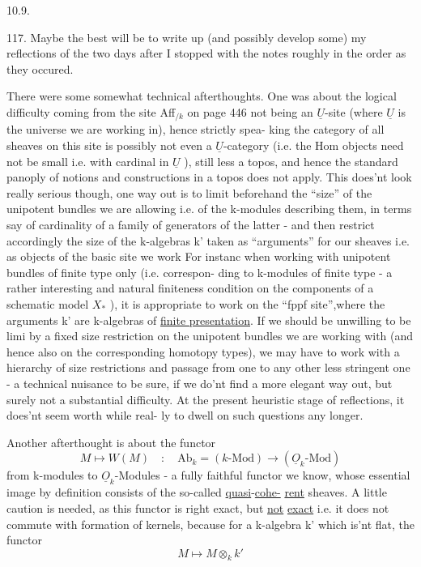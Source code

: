 
10.9.

117. Maybe the best will be to write up (and possibly develop some)
my reflections \hand{(}of the two days after I stopped with the
notes\hand{)} roughly in the order as they occured.

There were some somewhat technical afterthoughts. One was about the
logical difficulty coming from the site Aff$_{/k}$ on page 446 not being an
$\underline{U}$-site (where $\underline{U}$ is the universe we are working in), hence strictly spea-%
king the category of all sheaves on this site is possibly not even a
$\underline{U}$-category (i.e. the Hom objects need not be small i.e. with cardinal in
$\underline{U}$ ), still less a topos, and hence the standard panoply of notions and
constructions in a topos does not apply. This does'nt look really serious
though, one way out is to limit beforehand the ``size'' of the unipotent
bundles we are allowing i.e. of the k-modules describing them, in terms
say of cardinality of a family of generators of the latter - and then
restrict accordingly the size of the k-algebras k' taken as ``arguments''
for our sheaves i.e. as objects of the basic site we work For instanc
when working with unipotent bundles of finite type only (i.e. correspon-%
ding to k-modules of finite type - a rather interesting and natural
finiteness  condition on the components of a schematic model $X_{\ast}$ ),
it is appropriate to work on the ``fppf site'',where the arguments k' are
k-algebras of \uline{finite presentation}. If we should be unwilling to be limi
by a fixed size restriction on the unipotent bundles we are working with
(and hence also on the corresponding homotopy types), we may have to work
with a hierarchy of size restrictions and passage from one to any other
less stringent one - a technical nuisance to be sure, if we do'nt find
a more elegant way out, but surely not a substantial difficulty. At the
present heuristic stage of reflections, it does'nt seem worth while real-%
ly to dwell on such questions any longer.

Another afterthought is about the functor
\[ M \longmapsto W(M) \quad : \quad \mathrm{Ab}_k =(k\text{-Mod}) \longrightarrow (\underline{O}_k\text{-Mod}) \]
from k-modules to  $\underline{O}_k$-Modules - a fully faithful functor we know,
whose essential image by definition consists of the so-called \uline{quasi}-\uline{cohe-}%
\uline{rent} sheaves. A little caution is needed, as this functor is right
exact, but \uline{not} \uline{exact} i.e. it does not commute with formation of kernels,
because for a k-algebra k' which is'nt flat, the functor
\[ M \longmapsto M\otimes_k k' \]

